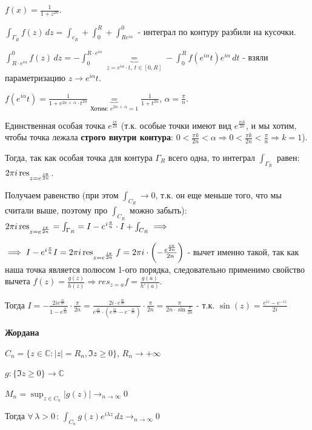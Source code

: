 \begin{example}
\begin{enumerate}
{            $f(x) = \frac{1}{1 + z^{2n}}$.

            $\int_{\Gamma_R} f(z) \, dz = \int_{c_R} + \int_{0}^{R} + \int_{Re^{i\alpha}}^{0}$ - интеграл по контуру разбили на кусочки.

            $\int_{R \cdot e^{i\alpha}}^{0} f(z) \, dz = -\int_{0}^{R \cdot e^{i \alpha}} \underbrace{=}_{z=e^{i\alpha} \cdot t, \ t \in [0, R]} -\int_{0}^{R} f(e^{i \alpha} t) e^{i \alpha} \, dt$ -
            взяли параметризацию $z \to e^{i \alpha} t$.

            $f(e^{i \alpha}t) = \frac{1}{1 + e^{2n\cdot i\cdot \alpha} \cdot t^{2n}} \underbrace{=}_{\text{Хотим: } e^{2n\cdot i\cdot \alpha} = 1} \frac{1}{1 + t^{2n}}$, $\alpha = \frac{\pi}{n}$.

            Единственная особая точка $e^{\frac{i \pi}{2n}}$ (т.к. особые точки имеют вид $e^{\frac{\pi i k}{2n}}$, и мы хотим, чтобы точка лежала \textbf{строго внутри контура}: $0 < \frac{\pi k}{2n} < \alpha \Rightarrow 0 < \frac{\pi k}{2n} < \frac{\pi}{n} \Rightarrow k=1$).

            Тогда, так как особая точка для контура $\Gamma_{R}$ всего одна, то интеграл $\int_{\Gamma_{R}}$ равен: $2 \pi i \operatorname{res}_{z=e^{\frac{i \pi}{2n}}}$.

            Получаем равенство (при этом $\int_{C_R} \rightarrow 0$, т.к. он еще меньше того, что мы считали выше, поэтому про $\int_{C_R}$ можно забыть): $2 \pi i \operatorname{res}_{z=e^{\frac{i \pi}{2n}}} = \int_{\Gamma_{R}} = I - e^{i\frac{\pi}{n}}\cdot I + \int_{C_R} \implies$

            $\implies I - e^{i \frac{\pi }{n}} I = 2 \pi i \operatorname{res}_{z = e^{\frac{i \pi}{2n}}} f = 2 \pi i \cdot \left ( - \frac{e^{\frac{i \pi}{2n}}}{2n}  \right )$ - вычет именно такой, так как наша точка является полюсом 1-ого порядка, следовательно применимо свойство вычета $f(z) = \frac{g(z)}{h(z)} \Rightarrow res_{z=a}f = \frac{g(a)}{h'(a)}$.

            Тогда $I = -\frac{2 i e^{\frac{i \pi}{2n}}}{1 - e^{\frac{i \pi}{2n}}} \cdot \frac{\pi}{2n} = \frac{2 i \cdot e^{\frac{2 \pi}{2n}}}{e^{\frac{i \pi}{2n}} \cdot (e^{\frac{i \pi}{2n}} - e^{-\frac{i \pi}{2n}})} \cdot \frac{\pi}{2n} = \frac{\pi}{2n \cdot \sin \frac{\pi}{2n}}$ - т.к. $\sin(z) = \frac{e^{iz} - e^{-iz}}{2i}$
        }
    \end{enumerate}
\end{example}

\begin{lemma}
    \textbf{Жордана}

    $C_{n} = \{ z \in \mathbb{C} : |z| = R_n, \Im z \geqslant 0 \}$, $R_n \rightarrow +\infty$

    $g : \{ \Im z \geqslant 0 \} \to \mathbb{C}$

    $M_{n} = \sup_{z \in C_{n}} |g(z)| \rightarrow_{n \to \infty} 0$

    Тогда $\forall \, \lambda > 0 \, : \, \int_{C_{n}} g(z) e^{i \lambda z} \, dz \rightarrow_{n \to \infty} 0$
\end{lemma}

